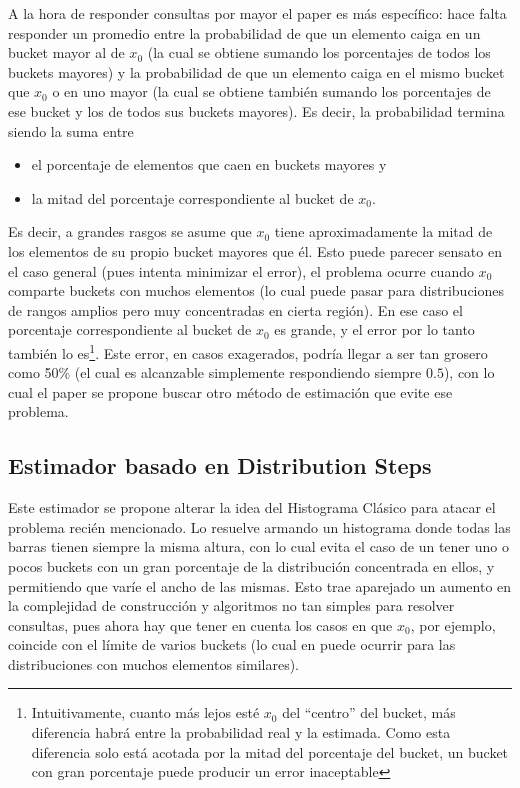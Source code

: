 A la hora de responder consultas por mayor el paper es más específico: hace falta responder un promedio entre la probabilidad de que un elemento caiga en un bucket mayor al de $x_0$ (la cual se obtiene sumando los porcentajes de todos los buckets mayores) y la probabilidad de que un elemento caiga en el mismo bucket que $x_0$ o en uno mayor (la cual se obtiene también sumando los porcentajes de ese bucket y los de todos sus buckets mayores). Es decir, la probabilidad termina siendo la suma entre
\begin{itemize}
 \item el porcentaje de elementos que caen en buckets mayores y
 \item la mitad del porcentaje correspondiente al bucket de $x_0$.
\end{itemize}
Es decir, a grandes rasgos se asume que $x_0$ tiene aproximadamente la mitad de los elementos de su propio bucket mayores que él. Esto puede parecer sensato en el caso general (pues intenta minimizar el error), el problema ocurre cuando $x_0$ comparte buckets con muchos elementos (lo cual puede pasar para distribuciones de rangos amplios pero muy concentradas en cierta región). En ese caso el porcentaje correspondiente al bucket de $x_0$ es grande, y el error por lo tanto también lo es\footnote{Intuitivamente, cuanto más lejos esté $x_0$ del ``centro'' del bucket, más diferencia habrá entre la probabilidad real y la estimada. Como esta diferencia solo está acotada por la mitad del porcentaje del bucket, un bucket con gran porcentaje puede producir un error inaceptable}. Este error, en casos exagerados, podría llegar a ser tan grosero como 50\% (el cual es alcanzable simplemente respondiendo siempre $0.5$), con lo cual el paper se propone buscar otro método de estimación que evite ese problema.

\subsection{Estimador basado en Distribution Steps}
Este estimador se propone alterar la idea del Histograma Clásico para atacar el problema recién mencionado. Lo resuelve armando un histograma donde todas las barras tienen siempre la misma altura, con lo cual evita el caso de un tener uno o pocos buckets con un gran porcentaje de la distribución concentrada en ellos, y permitiendo que varíe el ancho de las mismas. Esto trae aparejado un aumento en la complejidad de construcción y algoritmos no tan simples para resolver consultas, pues ahora hay que tener en cuenta los casos en que $x_0$, por ejemplo, coincide con el límite de varios buckets (lo cual en puede ocurrir para las distribuciones con muchos elementos similares).

